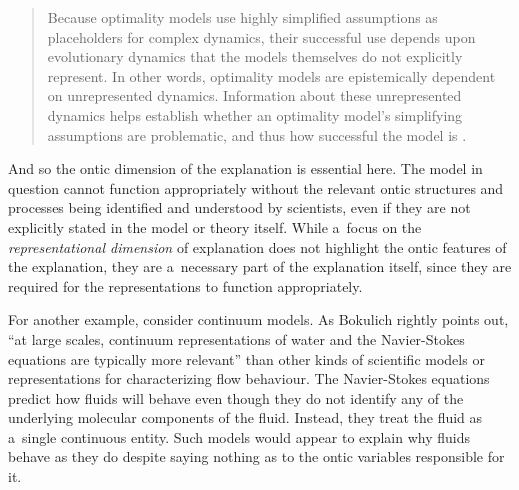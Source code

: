 \begin{quotation}
Because optimality models use highly simplified assumptions as placeholders for complex dynamics, their successful use depends upon evolutionary dynamics that the models themselves do not explicitly represent. In other words, optimality models are epistemically dependent on unrepresented dynamics. Information about these unrepresented dynamics helps establish whether an optimality model's simplifying assumptions are problematic, and thus how successful the model is
\parencite[][p.226]{potochnik_explanatory_2010}.%


\end{quotation}
And so the ontic dimension of the explanation is essential here. The model in question cannot function appropriately without the relevant ontic structures and processes being identified and understood by scientists, even if they are not explicitly stated in the model or theory itself. While a~focus on the \textit{representational dimension} of explanation does not highlight the ontic features of the explanation, they are a~necessary part of the explanation itself, since they are required for the representations to function appropriately.

For another example, consider continuum models. As Bokulich
\parencite*[][p.803]{bokulich_representing_2018} %
 rightly points out, ``at large scales, continuum representations of water and the Navier-Stokes equations are typically more relevant'' than other kinds of scientific models or representations for characterizing flow behaviour. The Navier-Stokes equations predict how fluids will behave even though they do not identify any of the underlying molecular components of the fluid. Instead, they treat the fluid as a~single continuous entity. Such models would appear to explain why fluids behave as they do despite saying nothing as to the ontic variables responsible for it.

